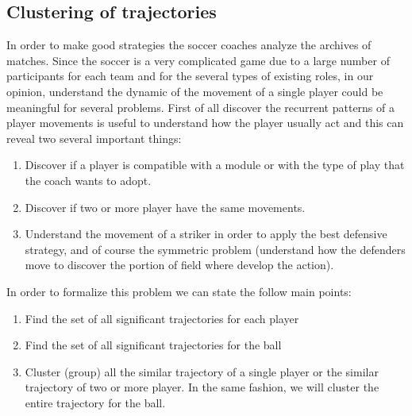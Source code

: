 \documentclass{acm_proc_article-sp-sigmod07}
\begin{document}
\subsection{Clustering of trajectories}
In order to make good strategies the soccer coaches analyze the archives of matches. Since the soccer is a very complicated game due to a large number of participants for each team and for the several types of existing roles, in our opinion, understand the dynamic of the movement of a single player could be meaningful for several problems. First of all discover the recurrent patterns of a player movements is useful to understand how the player usually act and this can reveal two several important things:
\begin{enumerate}
  \item Discover if a player is compatible with a module or with the type of play that the coach wants to adopt. 
  \item Discover if two or more player have the same movements.
  \item Understand the movement of a striker in order to apply the best defensive strategy, and of course the symmetric problem (understand how the defenders move to discover the portion of field where develop the action).
\end{enumerate}
In order to formalize this problem we can state the follow main points:
\begin{enumerate}
  \item Find the set of all significant trajectories for each player
  \item Find the set of all significant trajectories for the ball
  \item Cluster (group) all the similar trajectory of a single player or the similar trajectory of two or more player. In the same fashion, we will cluster the entire trajectory for the ball.
\end{enumerate}
\end{document}
